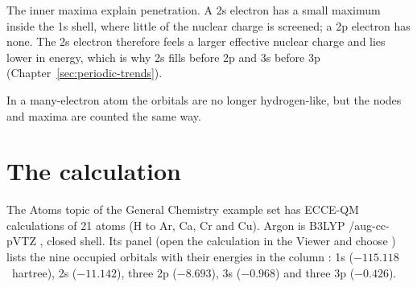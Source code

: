 The inner maxima explain penetration. A 2s electron has a small maximum inside the 1s shell, where little of the nuclear charge is screened; a 2p electron has none. The 2s electron therefore feels a larger effective nuclear charge and lies lower in energy, which is why 2s fills before 2p and 3s before 3p (Chapter~\ref{sec:periodic-trends}).

In a many-electron atom the orbitals are no longer hydrogen-like, but the nodes and maxima are counted the same way.

\section{The calculation}
The Atoms topic of the General Chemistry example set has ECCE-QM calculations of 21 atoms (H to Ar, Ca, Cr and Cu). Argon is B3LYP \cite{becke1993}/aug-cc-pVTZ \cite{woon1993}, closed shell. Its  panel (open the calculation in the Viewer and choose ) lists the nine occupied orbitals with their energies in the column : 1s ($-115.118$~hartree), 2s ($-11.142$), three 2p ($-8.693$), 3s ($-0.968$) and three 3p ($-0.426$).


